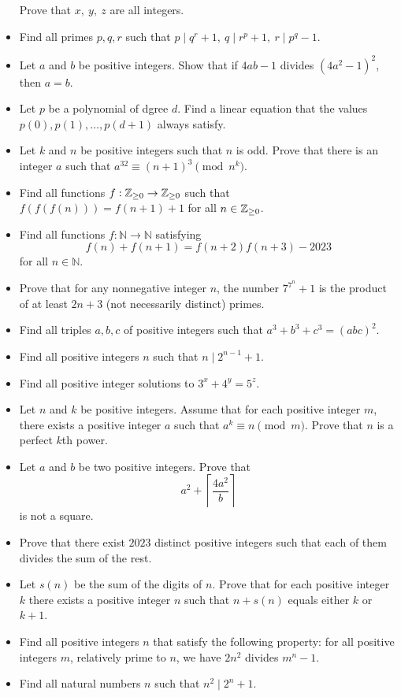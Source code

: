 \begin{itemize}
    Prove that $x,\ y,\ z$ are all integers.
  \item Find all primes $p,q,r$ such that $p\mid q^r+1,\ q\mid r^p+1,\ r\mid
    p^q-1$.
    \item Let $a$ and $b$ be positive integers. Show that if $4ab-1$ divides
      $(4a^2-1)^2$, then $a=b$.
  \item Let $p$ be a polynomial of dgree $d$. Find a linear
    equation that the values $p(0),p(1),\ldots,p(d+1)$ always satisfy.
  \item Let $k$ and $n$ be positive integers such that $n$ is odd. Prove that
    there is an integer $a$ such that $a^{32}\equiv(n+1)^3\pmod{n^k}$.
  \item Find all functions $f:\mathbb{Z}_{\ge 0}\to \mathbb{Z}_{\ge 0}$ such that
    $f(f(f(n)))=f(n+1)+1$ for all $n\in\mathbb{Z}_{\ge 0}$.
  \item Find all functions $f:\mathbb N\to\mathbb N$ satisfying 
    \[f(n)+f(n+1)=f(n+2)f(n+3)-2023\]
    for all $n\in\mathbb N$.
    \item Prove that for any nonnegative integer $n$, the number $7^{7^n}+1$ is
      the product of at least $2n+3$ (not necessarily distinct) primes.
\item Find all triples $a,b,c$ of positive integers such that
      $a^3+b^3+c^3=(abc)^2$.
  \item Find all positive integers $n$ such that $n\mid 2^{n-1}+1$.
  \item Find all positive integer solutions to $3^x+4^y=5^z$.
    \item Let $n$ and $k$ be positive integers. Assume that for each positive
      integer $m$, there exists a positive integer $a$ such that $a^k\equiv
      n\pmod m$. Prove that $n$ is a perfect $k$th power.
  \item Let $a$ and $b$ be two positive integers. Prove that
    \[a^2+\left\lceil\frac{4a^2}b\right\rceil\] is not a square.
  \item Prove that there exist $2023$ distinct positive integers such that each of them
    divides the sum of the rest.
  \item Let $s(n)$ be the sum of the digits of $n$. Prove that for each positive
    integer $k$ there exists a positive integer $n$ such that $n+s(n)$ equals
    either $k$ or $k+1$.
  \item Find all positive integers $n$ that satisfy the following property:
    for all positive integers $m$, relatively prime to $n$, we have
    $2n^2$ divides $m^n-1$.
  \item Find all natural numbers $n$ such that $n^2\mid 2^n+1$.

\end{itemize}
